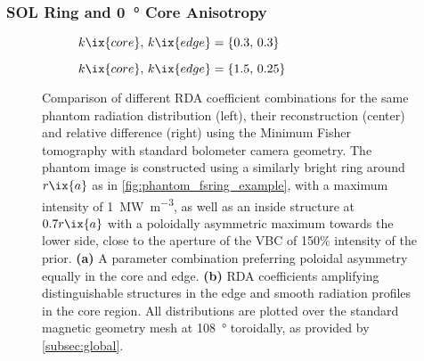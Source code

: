             \subsubsection*{SOL Ring and \SI{0}{\degree} Core Anisotropy}%
%
                \begin{figure}[t]%
                    \centering%
                    \begin{subfigure}{\textwidth}%
                        \centering%
                        \caption{$k\ix{core},\,k\ix{edge}=\left\{0.3,\,0.3\right\}$}%
                    \end{subfigure}%
                    \newline%
                    \begin{subfigure}{\textwidth}%
                        \centering%
                        \caption{$k\ix{core},\,k\ix{edge}=\left\{1.5,\,0.25\right\}$}%
                    \end{subfigure}%
                    \caption{Comparison of different RDA coefficient combinations for the same phantom radiation distribution (left), their reconstruction (center) and relative difference (right) using the Minimum Fisher tomography with standard bolometer camera geometry. The phantom image is constructed using a similarly bright ring around $r\ix{a}$ as in \cref{fig:phantom_fsring_example}, with a maximum intensity of \SI{1}{\mega\watt\per\cubic\meter}, as well as an inside structure at $0.7r\ix{a}$ with a poloidally asymmetric maximum towards the lower side, close to the aperture of the VBC of 150\% intensity of the prior. \textbf{(a)} A parameter combination preferring poloidal asymmetry equally in the core and edge. \textbf{(b)} RDA coefficients amplifying distinguishable structures in the edge and smooth radiation profiles in the core region. All distributions are plotted over the standard magnetic geometry mesh at \SI{108}{\degree} toroidally, as provided by \cref{subsec:global}.}\label{fig:phantom_fsring_asym_0deg_2D}%
                \end{figure}%
